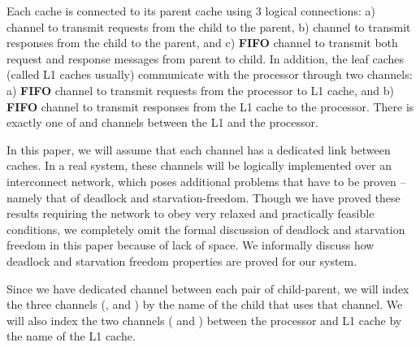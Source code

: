 Each cache is connected to its parent cache using 3 logical connections: a)
\cpReq{} channel to transmit requests from the child to the parent, b) \cpResp{}
channel to transmit responses from the child to the parent, and c) \pc{}
\textbf{FIFO} channel to transmit both request and response messages from
parent to child. In addition, the leaf caches (called L1 caches usually)
communicate with the processor through two channels: a) \cproc{} \textbf{FIFO}
channel to transmit requests from the processor to L1 cache, and b) \procc{}
\textbf{FIFO} channel to transmit responses from the L1 cache to the processor.
There is exactly one of \cproc{} and \procc{} channels between the L1 and the processor.

In this paper, we will assume that each channel has a dedicated link between
caches. In a real system, these channels will be logically implemented over an
interconnect network, which poses additional problems that have to be proven --
namely that of deadlock and starvation-freedom. Though we have proved these
results requiring the network to obey very relaxed and practically feasible
conditions, we completely omit the formal discussion of deadlock and starvation
freedom in this paper because of lack of space. We  informally
discuss how deadlock and starvation freedom properties are proved for our
system.

Since we have dedicated channel between each pair of child-parent, we will
index the three channels (\cpReq{}, \cpResp{} and \pc{}) by the name of the
child that uses that channel. We will also index the two channels (\cproc{} and
\procc{}) between the processor and L1 cache by the name of the L1 cache.

